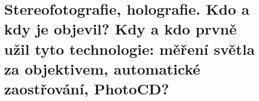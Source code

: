 \section{Stereofotografie, holografie. Kdo a kdy je objevil? Kdy a kdo prvně užil tyto technologie: měření světla za 
objektivem, automatické zaostřování, PhotoCD?}